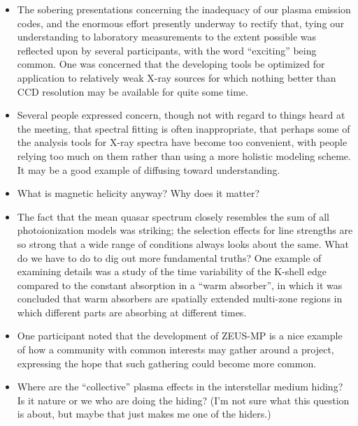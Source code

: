 \documentclass[proceedings]{rmaa}
\begin{document}
\begin{itemize}
\item  The sobering presentations concerning the inadequacy of our plasma 
emission codes, and the enormous effort presently underway to rectify 
that, tying our understanding to laboratory measurements to the extent 
possible was reflected upon by several participants, with the word 
``exciting'' being common.  One was concerned that the developing tools be  
optimized for application to relatively weak X-ray sources for which 
nothing better than CCD resolution may be available for quite some time.

\item  Several people expressed concern, though not with regard to things 
heard at the meeting, that spectral fitting is often inappropriate, that  
perhaps some of the analysis tools for X-ray spectra have become too 
convenient, with people relying too much on them rather than using a more 
holistic modeling scheme.  It may be a good example of diffusing toward 
understanding.

\item  What is magnetic helicity anyway?  Why does it matter?

\item  The fact that the mean quasar spectrum closely resembles the sum of  
all photoionization models was striking; the selection effects for line 
strengths are so strong that a wide range of conditions always looks 
about the same.  What do we have to do to dig out more fundamental 
truths?  One example of examining details was a study of the time 
variability of the  K-shell edge compared to the constant  
absorption in a ``warm absorber'', in which it was concluded that warm 
absorbers are spatially extended multi-zone regions in which different 
parts are absorbing at different times.

\item  One participant noted that the development of ZEUS-MP is a nice 
example of how a community with common interests may gather around a 
project, expressing the hope that such gathering could become more 
common. 

\item  Where are the ``collective'' plasma effects in the interstellar medium 
hiding?  Is it nature or we who are doing the hiding?  (I'm not sure what 
this question is about, but maybe that just makes me one of the hiders.)


\end{itemize}
\end{document}
